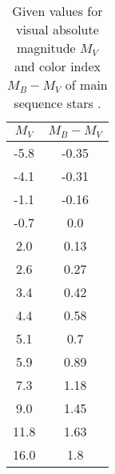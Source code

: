 \begin{table}[H]
	\centering
	\begin{tabular}{ c  c }
		\\\hline
		\centering
			$M_V$ & $M_B-M_V$ \\\hline
			-5.8 & -0.35 \\
			-4.1 & -0.31 \\
			-1.1 & -0.16 \\
			-0.7 & 0.0 \\
			2.0 & 0.13 \\
			2.6 & 0.27 \\
			3.4 & 0.42 \\
			4.4 & 0.58 \\
			5.1 & 0.7 \\
			5.9 & 0.89 \\
			7.3 & 1.18 \\
			9.0 & 1.45 \\
			11.8 & 1.63 \\
			16.0 & 1.8 \\\hline
	\end{tabular}
	\caption{\label{Tab:GivenData}Given values for visual absolute magnitude $M_V$ and color index $M_B-M_V$ of main sequence stars \cite{Pleiades}.}
\end{table}
